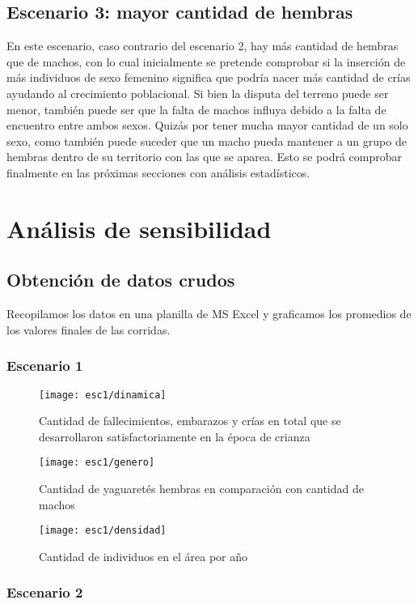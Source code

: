     \subsection{Escenario 3: mayor cantidad de hembras}
      En este escenario, caso contrario del escenario 2, hay más cantidad de hembras que de machos, con lo cual inicialmente se pretende comprobar si la inserción de más individuos de sexo femenino significa que podría nacer más cantidad de crías ayudando al crecimiento poblacional. Si bien la disputa del terreno puede ser menor, también puede ser que la falta de machos influya debido a la falta de encuentro entre ambos sexos. Quizás por tener mucha mayor cantidad de un solo sexo, como también puede suceder que un macho pueda mantener a un grupo de hembras dentro de su territorio con las que se aparea. Esto se podrá comprobar finalmente en las próximas secciones con análisis estadísticos.

    \section{Análisis de sensibilidad}

\subsection{Obtención de datos crudos}

Recopilamos los datos en una planilla de MS Excel y graficamos los promedios de los valores finales de las corridas.

\subsubsection{Escenario 1}
\begin{figure}[H]
    \texttt{[image: esc1/dinamica]}
    \caption{Cantidad de fallecimientos, embarazos y crías en total que se desarrollaron satisfactoriamente en la época de crianza}\label{fig:fig1-1}
    \endminipage\hfill
    \texttt{[image: esc1/genero]}
    \caption{Cantidad de yaguaretés hembras en comparación con cantidad de machos}\label{fig:fig1-2}
    \endminipage\hfill
    \texttt{[image: esc1/densidad]}
    \caption{Cantidad de individuos en el área por año}\label{fig:fig1-3}
    \endminipage
\end{figure}

\subsubsection{Escenario 2}

